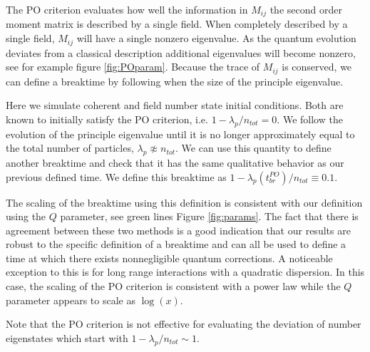 \documentclass[aps,prd,twocolumn,superscriptaddress]{revtex4-1}
\begin{document}
The PO criterion evaluates how well the information in $M_{ij}$ the second order moment matrix is described by a single field. When completely described by a single field, $M_{ij}$ will have a single nonzero eigenvalue. As the quantum evolution deviates from a classical description additional eigenvalues will become nonzero, see for example figure \ref{fig:POparam}. Because the trace of $M_{ij}$ is conserved, we can define a breaktime by following when the size of the principle eigenvalue. 

Here we simulate coherent and field number state initial conditions. Both are known to initially satisfy the PO criterion, i.e. $1 - \lambda_p/n_{tot} = 0$. We follow the evolution of the principle eigenvalue until it is no longer approximately equal to the total number of particles, $\lambda_p \not\approx n_{tot}$. We can use this quantity to define another breaktime and check that it has the same qualitative behavior as our previous defined time. We define this breaktime as $1 - \lambda_p(t^{PO}_{br})/n_{tot} \equiv 0.1$.

The scaling of the breaktime using this definition is consistent with our definition using the $Q$ parameter, see green lines Figure \ref{fig:params}. The fact that there is agreement between these two methods is a good indication that our results are robust to the specific definition of a breaktime and can all be used to define a time at which there exists nonnegligible quantum corrections. A noticeable exception to this is for long range interactions with a quadratic dispersion. In this case, the scaling of the PO criterion is consistent with a power law while the $Q$ parameter appears to scale as $\log(x)$.

Note that the PO criterion is not effective for evaluating the deviation of number eigenstates which start with $1-\lambda_p/n_{tot} \sim 1$. 
\end{document}
